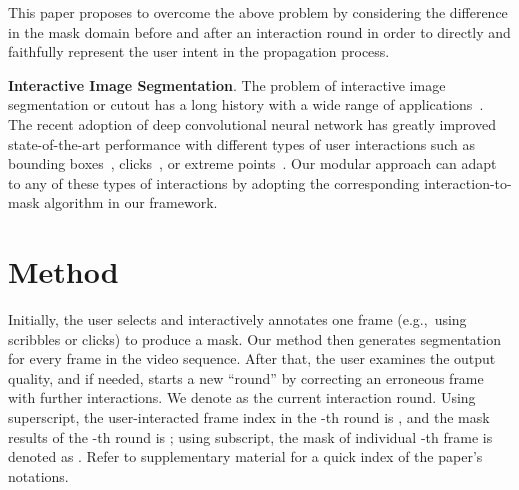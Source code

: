 \documentclass[final]{cvpr}
\begin{document}
	This paper proposes to overcome the above problem by considering the difference in the mask domain before and after an interaction round in order to directly and faithfully represent the user intent in the propagation process.
	
	\noindent\textbf{Interactive Image Segmentation}.
	The problem of interactive image segmentation or cutout has a long history with a wide range of applications~\cite{li2004lazy, mortensen1995intelligent, kass1988snakes, rother2004grabcut}. The recent adoption of deep convolutional neural network has greatly improved state-of-the-art performance with different types of user interactions such as bounding boxes~\cite{xu2017deepGrabCut}, clicks~\cite{xu2016deepObjectSelection, sofiiuk2020fbrs, sofiiuk2020fbrs}, or extreme points~\cite{maninis2018deepExtremePointsCut, agustsson2019interactiveAllRegions}.
	Our modular approach can adapt to any of these types of interactions by adopting the corresponding interaction-to-mask algorithm in our framework.
	\vspace{-4pt}
	
	\section{Method}
	\vspace{-1pt}
Initially, the user selects and interactively annotates one frame (e.g.,~using scribbles or clicks) to produce a mask. Our method then generates segmentation for every frame in the video sequence. After that, the user examines the output quality, and if needed, starts a new ``round'' by correcting an erroneous frame with further interactions. 
	We denote  as the current interaction round. Using superscript, the user-interacted frame index in the -th round is , and the mask results of the -th round is ; using subscript, the mask of individual -th frame is denoted as . Refer to supplementary material for a quick index of the paper's notations.


	\vspace{-2pt}
\end{document}
